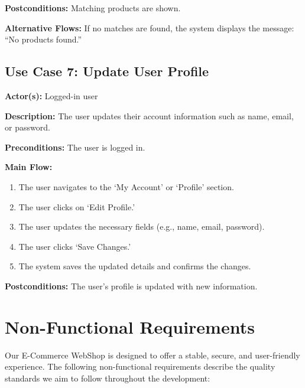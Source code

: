 \documentclass[12pt]{article}
\begin{document}
\textbf{Postconditions:} Matching products are shown.

\textbf{Alternative Flows:} If no matches are found, the system displays the message: ``No products found.''

\subsection*{Use Case 7: Update User Profile}

\textbf{Actor(s):} Logged-in user

\textbf{Description:} The user updates their account information such as name, email, or password.

\textbf{Preconditions:} The user is logged in.

\textbf{Main Flow:}
\begin{enumerate}
	\item The user navigates to the `My Account' or `Profile' section.
	\item The user clicks on `Edit Profile.'
	\item The user updates the necessary fields (e.g., name, email, password).
	\item The user clicks `Save Changes.'
	\item The system saves the updated details and confirms the changes.
\end{enumerate}

\textbf{Postconditions:} The user's profile is updated with new information.

\section{Non-Functional Requirements}\label{sec:non-functional-requirements}

Our E-Commerce WebShop is designed to offer a stable, secure, and user-friendly experience.
The following non-functional requirements describe the quality standards we aim to follow throughout the development:
\end{document}
